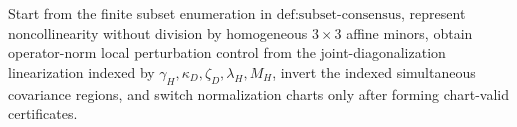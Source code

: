 Start from the finite subset enumeration in \(\text{def:subset-consensus}\), represent noncollinearity without division by homogeneous \(3\times3\) affine minors, obtain operator-norm local perturbation control from the joint-diagonalization linearization indexed by \(\gamma_H,\kappa_D,\zeta_D,\lambda_H,M_H\), invert the indexed simultaneous covariance regions, and switch normalization charts only after forming chart-valid certificates.